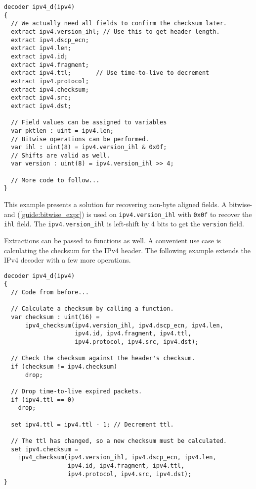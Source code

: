 \begin{codepage}
\begin{lstlisting}
decoder ipv4_d(ipv4)
{
  // We actually need all fields to confirm the checksum later.
  extract ipv4.version_ihl; // Use this to get header length.
  extract ipv4.dscp_ecn;
  extract ipv4.len;
  extract ipv4.id;
  extract ipv4.fragment;
  extract ipv4.ttl;       // Use time-to-live to decrement
  extract ipv4.protocol;
  extract ipv4.checksum;
  extract ipv4.src;
  extract ipv4.dst;

  // Field values can be assigned to variables
  var pktlen : uint = ipv4.len;
  // Bitwise operations can be performed.
  var ihl : uint(8) = ipv4.version_ihl & 0x0f;
  // Shifts are valid as well.
  var version : uint(8) = ipv4.version_ihl >> 4;
  
  // More code to follow...
}
\end{lstlisting}
\end{codepage}

This example presents a solution for recovering non-byte aligned
fields. A bitwise-and (\ref{guide:bitwise_expr}) is used on \texttt{ipv4.version\_ihl}
with \texttt{0x0f} to recover the \texttt{ihl} field. The 
\texttt{ipv4.version\_ihl} is left-shift by 4 bits to get the \texttt{version} field.

Extractions can be passed to functions as well. A convenient use case is calculating the checksum for the IPv4 header. The following example extends the IPv4 decoder with a few more operations.

\begin{codepage}
\begin{lstlisting}
decoder ipv4_d(ipv4)
{
  // Code from before...
  
  // Calculate a checksum by calling a function.
  var checksum : uint(16) =
 	  ipv4_checksum(ipv4.version_ihl, ipv4.dscp_ecn, ipv4.len, 
                    ipv4.id, ipv4.fragment, ipv4.ttl, 
                    ipv4.protocol, ipv4.src, ipv4.dst);

  // Check the checksum against the header's checksum.
  if (checksum != ipv4.checksum)
	  drop;

  // Drop time-to-live expired packets.
  if (ipv4.ttl == 0)
    drop;

  set ipv4.ttl = ipv4.ttl - 1; // Decrement ttl.

  // The ttl has changed, so a new checksum must be calculated.
  set ipv4.checksum =
    ipv4_checksum(ipv4.version_ihl, ipv4.dscp_ecn, ipv4.len, 
                  ipv4.id, ipv4.fragment, ipv4.ttl, 
                  ipv4.protocol, ipv4.src, ipv4.dst);
}
\end{lstlisting}
\end{codepage}

